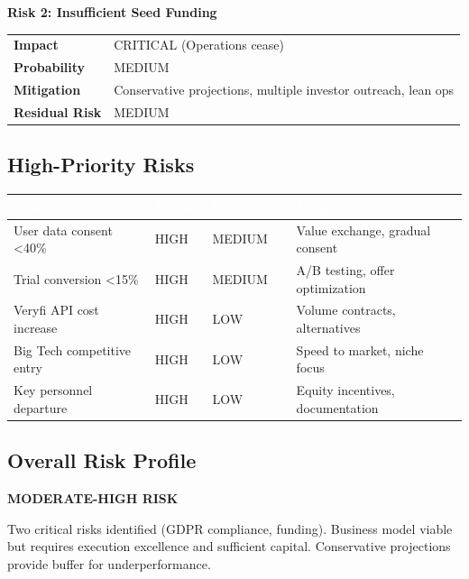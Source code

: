 \documentclass[11pt,a4paper]{article}
\begin{document}
\vspace{10pt}

\begin{riskbox}
\textbf{\Large\textcolor{milored}{Risk 2: Insufficient Seed Funding}}

\vspace{10pt}
\begin{tabular}{L{3cm} L{9cm}}
    \textbf{Impact} & CRITICAL (Operations cease)\\
    \textbf{Probability} & MEDIUM\\
    \textbf{Mitigation} & Conservative projections, multiple investor outreach, lean ops\\
    \textbf{Residual Risk} & MEDIUM\\
\end{tabular}
\end{riskbox}

\subsection{High-Priority Risks}

\begin{center}
\begin{tabular}{L{4.5cm} C{1.5cm} C{2cm} L{4.5cm}}
    \toprule
    \textcolor{white}{\textbf{Risk}} & \textcolor{white}{\textbf{Impact}} & \textcolor{white}{\textbf{Probability}} & \textcolor{white}{\textbf{Mitigation}}\\
    \midrule
    User data consent <40\% & HIGH & MEDIUM & Value exchange, gradual consent\\
    Trial conversion <15\% & HIGH & MEDIUM & A/B testing, offer optimization\\
    Veryfi API cost increase & HIGH & LOW & Volume contracts, alternatives\\
    Big Tech competitive entry & HIGH & LOW & Speed to market, niche focus\\
    Key personnel departure & HIGH & LOW & Equity incentives, documentation\\
    \bottomrule
\end{tabular}
\end{center}

\subsection{Overall Risk Profile}

\begin{highlightbox}[title=Risk Assessment]
\textbf{\Large MODERATE-HIGH RISK}

\vspace{10pt}
Two critical risks identified (GDPR compliance, funding). Business model viable but requires execution excellence and sufficient capital. Conservative projections provide buffer for underperformance.
\end{highlightbox}
\end{document}
